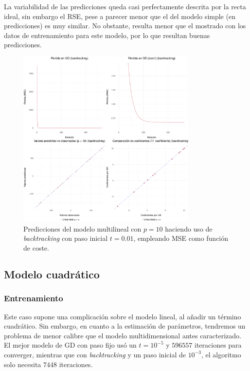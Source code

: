 \documentclass[11pt]{opticajnl}
\begin{document}
La variabilidad de las predicciones queda casi perfectamente descrita por la recta ideal, sin embargo el RSE, pese a parecer menor que el del modelo simple (en predicciones) es muy similar. No obstante, resulta menor que el mostrado con los datos de entrenamiento para este modelo, por lo que resultan buenas predicciones.

\begin{figure}[H]
\centering
\includegraphics[width=0.8\textwidth]{fotos/plot_multi_pred.pdf}
\caption{Predicciones del modelo multilineal con $p=10$ haciendo uso de \textit{backtracking} con paso inicial $t = 0.01$, empleando MSE como función de coste.}
\label{fig:22}
\end{figure}


\subsection{Modelo cuadrático}

\subsubsection{Entrenamiento}

Este caso supone una complicación sobre el modelo lineal, al añadir un término cuadrático. Sin embargo, en cuanto a la estimación de parámetros, tendremos un problema de menor calibre que el modelo multidimensional antes caracterizado. \\

El mejor modelo de GD con paso fijo usó un $t = 10^{-5}$ y $596557$ iteraciones para converger, mientras que con \textit{backtracking} y un paso inicial de $10^{-3}$, el algoritmo solo necesita $7448$ iteraciones. \\
\end{document}
